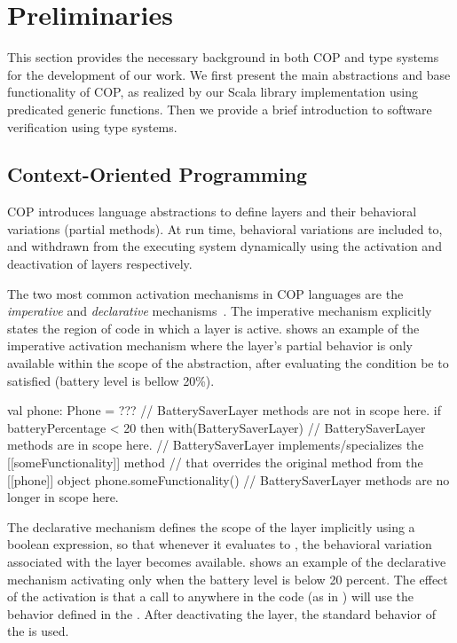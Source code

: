 
\section{Preliminaries}
\label{sec:preliminaries}

This section provides the necessary background in both \ac{COP} and type systems for the 
development of our work. We first present the main abstractions and base functionality of \ac{COP}, 
as realized by our Scala library implementation using predicated generic functions. Then we provide a 
brief introduction to software verification  using type systems.


\subsection{Context-Oriented Programming}
\label{sec:cop}

\ac{COP} introduces language abstractions to define layers and their behavioral variations (\ie partial 
methods). At run time, behavioral variations are included to, and withdrawn from 
the executing system dynamically using the activation and deactivation of layers respectively.

The two most common activation mechanisms in \ac{COP} languages are the \emph{imperative} and 
\emph{declarative} mechanisms~\cite{cardozo22,elyasaf23,leger23}. The imperative mechanism 
explicitly states the region of code in which a layer is active.  shows an 
example of the imperative activation mechanism where the layer's partial behavior 
is only available within the scope of the  abstraction, after evaluating the condition 
be to satisfied (\ie battery level is bellow 20\%). 

\begin{scala}[label=lst:imperative-activation, caption=Imperative activation mechanism]
val phone: Phone = ???
// BatterySaverLayer methods are not in scope here.
if batteryPercentage < 20 then
  with(BatterySaverLayer) {
    // BatterySaverLayer methods are in scope here.
    // BatterySaverLayer implements/specializes the [[someFunctionality]] method
    // that overrides the original method from the [[phone]] object
    phone.someFunctionality()
  }
// BatterySaverLayer methods are no longer in scope here.
\end{scala}

The declarative mechanism defines the scope of the layer implicitly using a boolean expression, so 
that whenever it evaluates to , the behavioral variation associated with the layer becomes 
available.  shows an example of the declarative mechanism activating 
 only when the battery level is below 20 percent. The effect of the activation 
is that a call to  anywhere in the code (as in ) will use 
the behavior defined in the . After deactivating the layer, the standard 
behavior of the  is used.

